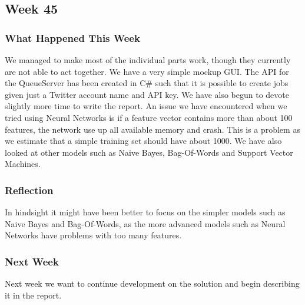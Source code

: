 \subsection{Week 45}
\subsubsection{What Happened This Week}
We managed to make most of the individual parts work, though they currently are
not able to act together. We have a very simple mockup \ac{GUI}. The \ac{API}
for the QueueServer has been created in C\# such that it is possible to create
jobs given just a Twitter account name and \ac{API} key. We have also begun to
devote slightly more time to write the report. An issue we have encountered when
we tried using Neural Networks is if a feature vector contains more than about
100 features, the network use up all available memory and crash. This is a
problem as we estimate that a simple training set should have about 1000. We
have also looked at other models such as Naive Bayes, Bag-Of-Words and Support
Vector Machines.

\subsubsection{Reflection} 
In hindsight it might have been better to focus on the simpler models such as
Naive Bayes and Bag-Of-Words, as the more advanced models such as Neural
Networks have problems with too many features. 

\subsubsection{Next Week}
Next week we want to continue development on the solution and begin
describing it in the report.

